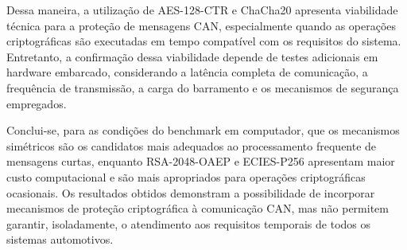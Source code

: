 Dessa maneira, a utilização de AES-128-CTR e ChaCha20 apresenta viabilidade técnica para a proteção de mensagens CAN, especialmente quando as operações criptográficas são executadas em tempo compatível com os requisitos do sistema. Entretanto, a confirmação dessa viabilidade depende de testes adicionais em hardware embarcado, considerando a latência completa de comunicação, a frequência de transmissão, a carga do barramento e os mecanismos de segurança empregados.

Conclui-se, para as condições do benchmark em computador, que os mecanismos simétricos são os candidatos mais adequados ao processamento frequente de mensagens curtas, enquanto RSA-2048-OAEP e ECIES-P256 apresentam maior custo computacional e são mais apropriados para operações criptográficas ocasionais. Os resultados obtidos demonstram a possibilidade de incorporar mecanismos de proteção criptográfica à comunicação CAN, mas não permitem garantir, isoladamente, o atendimento aos requisitos temporais de todos os sistemas automotivos.
